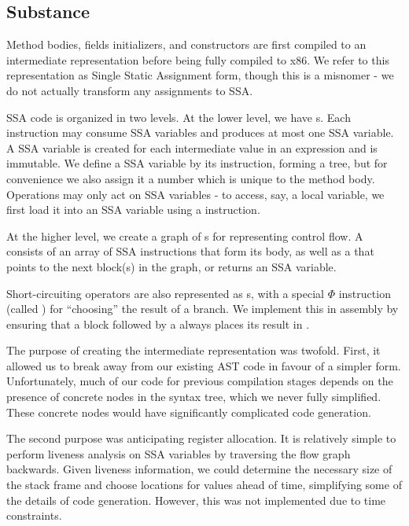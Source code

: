 \documentclass[pdftex,10pt,a4paper]{article}
\begin{document}
\subsection{Substance}

Method bodies, fields initializers, and constructors are first compiled to an
intermediate representation before being fully compiled to x86. We refer to this
representation as Single Static Assignment form, though this is a misnomer - we
do not actually transform any assignments to SSA.

SSA code is organized in two levels. At the lower level, we have
s. Each instruction may consume SSA variables and produces at
most one SSA variable. A SSA variable is created for each intermediate value in
an expression and is immutable. We define a SSA variable by its instruction,
forming a tree, but for convenience we also assign it a number which is unique to
the method body. Operations may only act on SSA variables - to access, say, a
local variable, we first load it into an SSA variable using a 
instruction.

At the higher level, we create a graph of s for representing
control flow. A  consists of an array of SSA instructions that
form its body, as well as a  that points to the next
block(s) in the graph, or returns an SSA variable.

Short-circuiting operators are also represented as s, with a
special $\Phi$ instruction (called ) for ``choosing'' the result of a
branch. We implement this in assembly by ensuring that a block followed by a
 always places its result in .

The purpose of creating the intermediate representation was twofold. First, it
allowed us to break away from our existing AST code in favour of a simpler form.
Unfortunately, much of our code for previous compilation stages depends on the
presence of concrete nodes in the syntax tree, which we never fully simplified.
These concrete nodes would have significantly complicated code generation.

The second purpose was anticipating register allocation. It is relatively simple
to perform liveness analysis on SSA variables by traversing the flow graph
backwards. Given liveness information, we could determine the necessary size of
the stack frame and choose locations for values ahead of time, simplifying some
of the details of code generation. However, this was not implemented
due to time constraints.
\end{document}
